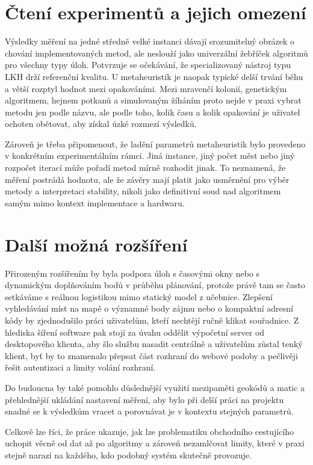 \section{Čtení experimentů a jejich omezení}

Výsledky měření na jedné středně velké instanci dávají srozumitelný obrázek o chování implementovaných metod, ale neslouží jako univerzální žebříček algoritmů pro všechny typy úloh. Potvrzuje se očekávání, že specializovaný nástroj typu LKH drží referenční kvalitu. U metaheuristik je naopak typické delší trvání běhu a větší rozptyl hodnot mezi opakováními. Mezi mravenčí kolonií, genetickým algoritmem, hejnem potkanů a simulovaným žíháním proto nejde v praxi vybrat metodu jen podle názvu, ale podle toho, kolik času a kolik opakování je uživatel ochoten obětovat, aby získal úzké rozmezí výsledků.

Zároveň je třeba připomenout, že ladění parametrů metaheuristik bylo provedeno v konkrétním experimentálním rámci. Jiná instance, jiný počet měst nebo jiný rozpočet iterací může pořadí metod mírně rozhodit jinak. To neznamená, že měření postrádá hodnotu, ale že závěry mají platit jako usměrnění pro výběr metody a interpretaci stability, nikoli jako definitivní soud nad algoritmem samým mimo kontext implementace a hardwaru.

\section{Další možná rozšíření}

Přirozeným rozšířením by byla podpora úloh s časovými okny nebo s dynamickým doplňováním bodů v průběhu plánování, protože právě tam se často setkáváme s reálnou logistikou mimo statický model z učebnice. Zlepšení vyhledávání míst na mapě o významné body zájmu nebo o kompaktní adresní kódy by zjednodušilo práci uživatelům, kteří nechtějí ručně klikat souřadnice. Z hlediska šíření software pak stojí za úvahu oddělit výpočetní server od desktopového klienta, aby šlo službu nasadit centrálně a uživatelům zůstal tenký klient, byť by to znamenalo přepsat část rozhraní do webové podoby a pečlivěji řešit autentizaci a limity volání rozhraní.

Do budoucna by také pomohlo důslednější využití mezipaměti geokódů a matic a přehlednější ukládání nastavení měření, aby bylo při delší práci na projektu snadné se k výsledkům vracet a porovnávat je v kontextu stejných parametrů.

Celkově lze říci, že práce ukazuje, jak lze problematiku obchodního cestujícího uchopit věcně od dat až po algoritmy a zároveň nezamlčovat limity, které v praxi stejně narazí na každého, kdo podobný systém skutečně provozuje.

